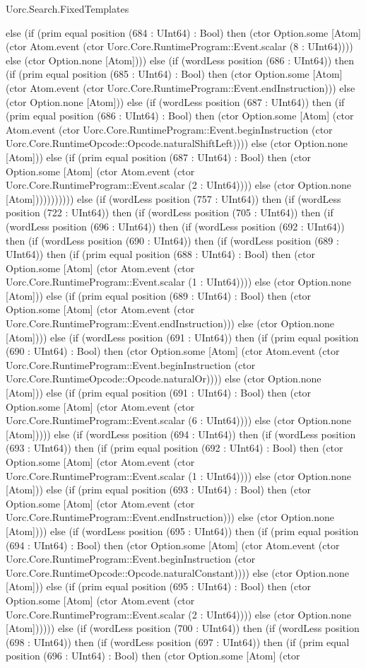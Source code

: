 \begin{lexlean}{Uorc.Search.FixedTemplates}
\begin{semanticmodule}
{else (if (prim equal position (684 : UInt64) : Bool) then (ctor Option.some [Atom] (ctor Atom.event (ctor Uorc.Core.RuntimeProgram::Event.scalar (8 : UInt64)))) else (ctor Option.none [Atom]))) else (if (wordLess position (686 : UInt64)) then (if (prim equal position (685 : UInt64) : Bool) then (ctor Option.some [Atom] (ctor Atom.event (ctor Uorc.Core.RuntimeProgram::Event.endInstruction))) else (ctor Option.none [Atom])) else (if (wordLess position (687 : UInt64)) then (if (prim equal position (686 : UInt64) : Bool) then (ctor Option.some [Atom] (ctor Atom.event (ctor Uorc.Core.RuntimeProgram::Event.beginInstruction (ctor Uorc.Core.RuntimeOpcode::Opcode.naturalShiftLeft)))) else (ctor Option.none [Atom])) else (if (prim equal position (687 : UInt64) : Bool) then (ctor Option.some [Atom] (ctor Atom.event (ctor Uorc.Core.RuntimeProgram::Event.scalar (2 : UInt64)))) else (ctor Option.none [Atom])))))))))) else (if (wordLess position (757 : UInt64)) then (if (wordLess position (722 : UInt64)) then (if (wordLess position (705 : UInt64)) then (if (wordLess position (696 : UInt64)) then (if (wordLess position (692 : UInt64)) then (if (wordLess position (690 : UInt64)) then (if (wordLess position (689 : UInt64)) then (if (prim equal position (688 : UInt64) : Bool) then (ctor Option.some [Atom] (ctor Atom.event (ctor Uorc.Core.RuntimeProgram::Event.scalar (1 : UInt64)))) else (ctor Option.none [Atom])) else (if (prim equal position (689 : UInt64) : Bool) then (ctor Option.some [Atom] (ctor Atom.event (ctor Uorc.Core.RuntimeProgram::Event.endInstruction))) else (ctor Option.none [Atom]))) else (if (wordLess position (691 : UInt64)) then (if (prim equal position (690 : UInt64) : Bool) then (ctor Option.some [Atom] (ctor Atom.event (ctor Uorc.Core.RuntimeProgram::Event.beginInstruction (ctor Uorc.Core.RuntimeOpcode::Opcode.naturalOr)))) else (ctor Option.none [Atom])) else (if (prim equal position (691 : UInt64) : Bool) then (ctor Option.some [Atom] (ctor Atom.event (ctor Uorc.Core.RuntimeProgram::Event.scalar (6 : UInt64)))) else (ctor Option.none [Atom])))) else (if (wordLess position (694 : UInt64)) then (if (wordLess position (693 : UInt64)) then (if (prim equal position (692 : UInt64) : Bool) then (ctor Option.some [Atom] (ctor Atom.event (ctor Uorc.Core.RuntimeProgram::Event.scalar (1 : UInt64)))) else (ctor Option.none [Atom])) else (if (prim equal position (693 : UInt64) : Bool) then (ctor Option.some [Atom] (ctor Atom.event (ctor Uorc.Core.RuntimeProgram::Event.endInstruction))) else (ctor Option.none [Atom]))) else (if (wordLess position (695 : UInt64)) then (if (prim equal position (694 : UInt64) : Bool) then (ctor Option.some [Atom] (ctor Atom.event (ctor Uorc.Core.RuntimeProgram::Event.beginInstruction (ctor Uorc.Core.RuntimeOpcode::Opcode.naturalConstant)))) else (ctor Option.none [Atom])) else (if (prim equal position (695 : UInt64) : Bool) then (ctor Option.some [Atom] (ctor Atom.event (ctor Uorc.Core.RuntimeProgram::Event.scalar (2 : UInt64)))) else (ctor Option.none [Atom]))))) else (if (wordLess position (700 : UInt64)) then (if (wordLess position (698 : UInt64)) then (if (wordLess position (697 : UInt64)) then (if (prim equal position (696 : UInt64) : Bool) then (ctor Option.some [Atom] (ctor }
\end{semanticmodule}
\end{lexlean}
